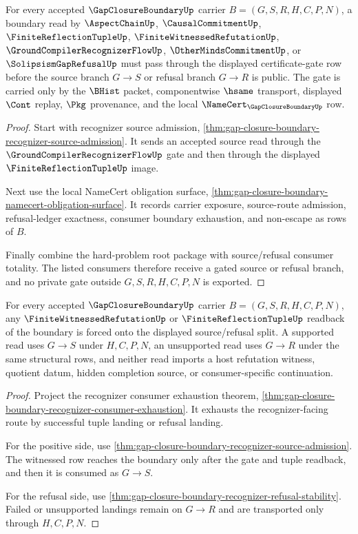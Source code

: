 \begin{theorem}
\label{thm:gap-closure-boundary-certificate-gate-row}
For every accepted $\GapClosureBoundaryUp$ carrier
$B=(G,S,R,H,C,P,N)$, a boundary read by $\AspectChainUp$,
$\CausalCommitmentUp$, $\FiniteReflectionTupleUp$,
$\FiniteWitnessedRefutationUp$, $\GroundCompilerRecognizerFlowUp$,
$\OtherMindsCommitmentUp$, or $\SolipsismGapRefusalUp$ must pass through the
displayed certificate-gate row before the source branch $G \longrightarrow S$
or refusal branch $G \longrightarrow R$ is public. The gate is carried only by
the $\BHist$ packet, componentwise $\hsame$ transport, displayed $\Cont$
replay, $\Pkg$ provenance, and the local $\NameCert_{\GapClosureBoundaryUp}$
row.
\end{theorem}
\begin{proof}
Start with recognizer source admission,
\autoref{thm:gap-closure-boundary-recognizer-source-admission}. It sends an
accepted source read through the $\GroundCompilerRecognizerFlowUp$ gate and
then through the displayed $\FiniteReflectionTupleUp$ image.

Next use the local NameCert obligation surface,
\autoref{thm:gap-closure-boundary-namecert-obligation-surface}. It records
carrier exposure, source-route admission, refusal-ledger exactness, consumer
boundary exhaustion, and non-escape as rows of $B$.

Finally combine the hard-problem root package with source/refusal consumer
totality. The listed consumers therefore receive a gated source or refusal
branch, and no private gate outside $G,S,R,H,C,P,N$ is exported.
\end{proof}

\begin{theorem}
\label{thm:gap-closure-boundary-witnessed-refutation-row}
For every accepted $\GapClosureBoundaryUp$ carrier $B=(G,S,R,H,C,P,N)$, any
$\FiniteWitnessedRefutationUp$ or $\FiniteReflectionTupleUp$ readback of the
boundary is forced onto the displayed source/refusal split. A supported read
uses $G \longrightarrow S$ under $H,C,P,N$, an unsupported read uses
$G \longrightarrow R$ under the same structural rows, and neither read imports
a host refutation witness, quotient datum, hidden completion source, or
consumer-specific continuation.
\end{theorem}
\begin{proof}
Project the recognizer consumer exhaustion theorem,
\autoref{thm:gap-closure-boundary-recognizer-consumer-exhaustion}. It exhausts
the recognizer-facing route by successful tuple landing or refusal landing.

For the positive side, use
\autoref{thm:gap-closure-boundary-recognizer-source-admission}. The witnessed
row reaches the boundary only after the gate and tuple readback, and then it
is consumed as $G \longrightarrow S$.

For the refusal side, use
\autoref{thm:gap-closure-boundary-recognizer-refusal-stability}. Failed or
unsupported landings remain on $G \longrightarrow R$ and are transported only
through $H,C,P,N$.
\end{proof}

